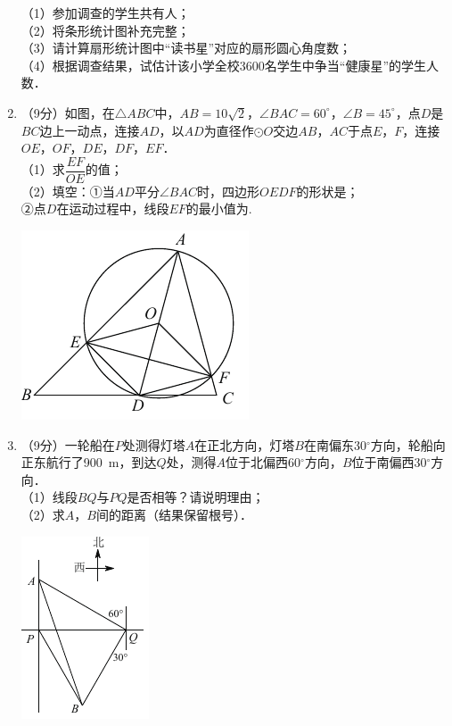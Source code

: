 \documentclass[11pt,twoside]{ctexart}
\begin{document}
\begin{enumerate}
（1）参加调查的学生共有\underline{\hspace*{2cm}}人；\\
（2）将条形统计图补充完整；\\
（3）请计算扇形统计图中“读书星”对应的扇形圆心角度数；\\
（4）根据调查结果，试估计该小学全校3600名学生中争当“健康星”的学生人数．

\vfill\null\newpage

\item
（9分）如图，在$\triangle ABC$中，$AB=10\sqrt 2 $，$\angle BAC=60^{\circ }$，$\angle B=45^{\circ }$，点$D$是$BC$边上一动点，连接$AD$，以$AD$为直径作$\odot O$交边$AB$，$AC$于点$E$，$F$，连接$OE$，$OF$，$DE$，$DF$，$EF$．
\\
（1）求$\dfrac{EF}{OE}$的值；\\
（2）填空：①当$AD$平分$\angle BAC$时，四边形$OEDF$的形状是\underline{\hspace*{2cm}}；
\\
②点$D$在运动过程中，线段$EF$的最小值为\underline{\hspace*{2cm}}.

\hfill\includegraphics[scale=1]{fig08.pdf}\quad
\vfill

\item
（9分）一轮船在$P$处测得灯塔$A$在正北方向，灯塔$B$在南偏东30$^{\circ }$方向，轮船向正东航行了900~m，到达$Q$处，测得$A$位于北偏西60$^{\circ }$方向，$B$位于南偏西30$^{\circ }$方向．
\\
（1）线段$BQ$与$PQ$是否相等？请说明理由；\\
（2）求$A$，$B$间的距离（结果保留根号）．

\hfill\includegraphics[scale=1.4]{fig09.pdf}\quad
\vfill
\vfill
\null
\newpage


\end{enumerate}
\end{document}
